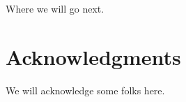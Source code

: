 \documentclass{acm_proc_article-sp}
\begin{document}
Where we will go next.

\section{Acknowledgments}

We will acknowledge some folks here.


  

\end{document}

